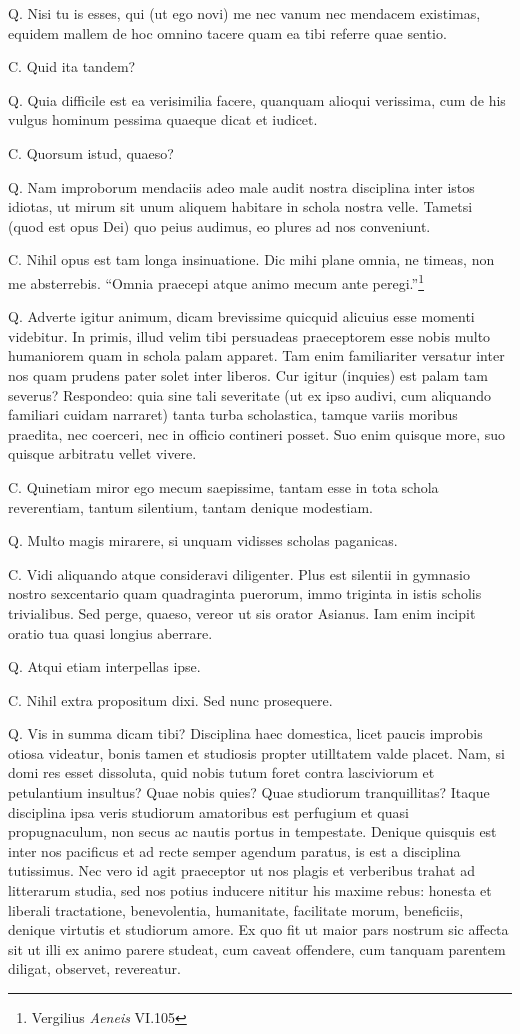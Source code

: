 \documentclass{article}
\begin{document}
Q. Nisi tu is esses, qui (ut ego novi) me nec vanum nec mendacem existimas, equidem mallem de hoc omnino tacere quam ea tibi referre quae sentio.

C. Quid ita tandem?

Q. Quia difficile est ea verisimilia facere, quanquam alioqui verissima, cum de his vulgus hominum pessima quaeque dicat et iudicet.

C. Quorsum istud, quaeso?

Q. Nam improborum mendaciis adeo male audit nostra disciplina inter istos idiotas, ut mirum sit unum aliquem habitare in schola nostra velle. Tametsi (quod est opus Dei) quo peius audimus, eo plures ad nos conveniunt.

C. Nihil opus est tam longa insinuatione. Dic mihi plane omnia, ne timeas, non me absterrebis. ``Omnia praecepi atque animo mecum ante peregi.''\footnote{Vergilius \emph{Aeneis} VI.105}

Q. Adverte igitur animum, dicam brevissime quicquid alicuius esse momenti videbitur. In primis, illud velim tibi persuadeas praeceptorem esse nobis multo humaniorem quam in schola palam apparet. Tam enim familiariter versatur inter nos quam prudens pater solet inter liberos. Cur igitur (inquies) est palam tam severus? Respondeo: quia sine tali severitate (ut ex ipso audivi, cum aliquando familiari cuidam narraret) tanta turba scholastica, tamque variis moribus praedita, nec coerceri, nec in officio contineri posset. Suo enim quisque more, suo quisque arbitratu vellet vivere.

C. Quinetiam miror ego mecum saepissime, tantam esse in tota schola reverentiam, tantum silentium, tantam denique modestiam.

Q. Multo magis mirarere, si unquam vidisses scholas paganicas.

C. Vidi aliquando atque consideravi diligenter. Plus est silentii in gymnasio nostro sexcentario quam quadraginta puerorum, immo triginta in istis scholis trivialibus. Sed perge, quaeso, vereor ut sis orator Asianus. Iam enim incipit oratio tua quasi longius aberrare.

Q. Atqui etiam interpellas ipse.

C. Nihil extra propositum dixi. Sed nunc prosequere.

Q. Vis in summa dicam tibi? Disciplina haec domestica, licet paucis improbis otiosa videatur, bonis tamen et studiosis propter utilltatem valde placet. Nam, si domi res esset dissoluta, quid nobis tutum foret contra lasciviorum et petulantium insultus? Quae nobis quies? Quae studiorum tranquillitas? Itaque disciplina ipsa veris studiorum amatoribus est perfugium et quasi propugnaculum, non secus ac nautis portus in tempestate. Denique quisquis est inter nos pacificus et ad recte semper agendum paratus, is est a disciplina tutissimus. Nec vero id agit praeceptor ut nos plagis et verberibus trahat ad litterarum studia, sed nos potius inducere nititur his maxime rebus: honesta et liberali tractatione, benevolentia, humanitate, facilitate morum, beneficiis, denique virtutis et studiorum amore. Ex quo fit ut maior pars nostrum sic affecta sit ut illi ex animo parere studeat, cum caveat offendere, cum tanquam parentem diligat, observet, revereatur.
\end{document}
